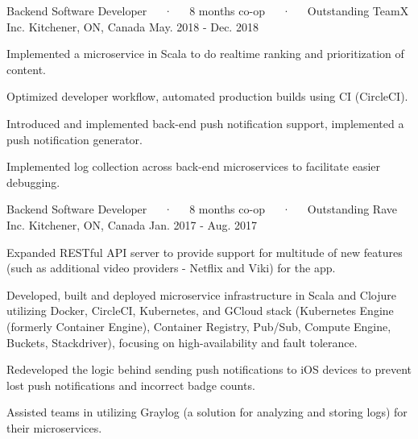 

\begin{cventries}
\cventry
{Backend Software Developer~~~·~~~8 months co-op~~~·~~~Outstanding} %
{TeamX Inc.} %
{Kitchener, ON, Canada} %
{May. 2018 - Dec. 2018} %
{
	\begin{cvitems} %
		\item {Implemented a microservice in Scala to do realtime ranking and prioritization of content.}
		\item {Optimized developer workflow, automated production builds using CI (CircleCI).}
		\item {Introduced and implemented back-end push notification support, implemented a push notification generator.}
		\item {Implemented log collection across back-end microservices to facilitate easier debugging.}
	\end{cvitems}
}

\cventry
{Backend Software Developer~~~·~~~8 months co-op~~~·~~~Outstanding} %
{Rave Inc.} %
{Kitchener, ON, Canada} %
{Jan. 2017 - Aug. 2017} %
{
	\begin{cvitems} %
		\item {Expanded RESTful API server to provide support for multitude of new features (such as additional video providers - Netflix and Viki) for the app.}
		\item {Developed, built and deployed microservice infrastructure in Scala and Clojure utilizing Docker, CircleCI, Kubernetes, and GCloud stack (Kubernetes Engine (formerly Container Engine), Container Registry, Pub/Sub, Compute Engine,  Buckets, Stackdriver), focusing on high-availability and fault tolerance.}
		\item {Redeveloped the logic behind sending push notifications to iOS devices to prevent lost push notifications and incorrect badge counts.}
		\item {Assisted teams in utilizing Graylog (a solution for analyzing and storing logs) for their microservices.}
	\end{cvitems}
}


\end{cventries}
